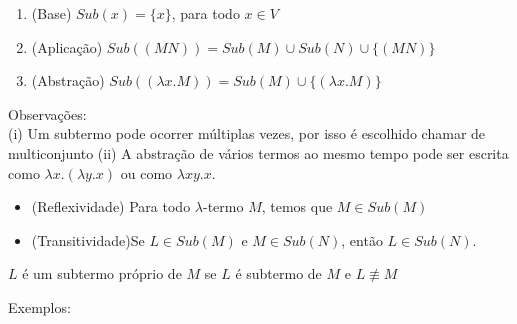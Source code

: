 \documentclass[../main.tex]{subfiles}
\begin{document}
\begin{definition}
    \hfill
    \begin{enumerate}
        \item (Base) $Sub(x) = \{x\}$, para todo $x \in V$
        \item (Aplicação) $Sub((M N)) = Sub(M) \cup Sub(N) \cup \{ (M N) \}$
        \item (Abstração) $Sub((\lambda x . M)) = Sub(M) \cup \{ (\lambda x . M) \}$
    \end{enumerate}

\end{definition}

Observações:\\
(i) Um subtermo pode ocorrer múltiplas vezes, por isso é escolhido chamar de multiconjunto
(ii) A abstração de vários termos ao mesmo tempo pode ser escrita como $\lambda x . (\lambda y . x)$ ou como $\lambda x y . x$.

\begin{lemma}
    \hfill
    \begin{itemize}
        \item (Reflexividade) Para todo $\lambda$-termo $M$, temos que $M \in Sub(M)$
        \item (Transitividade)Se $L \in Sub(M)$ e $M \in Sub(N)$, então $L \in Sub(N)$.
    \end{itemize}
\end{lemma}

\begin{definition}
    $L$ é um subtermo próprio de $M$ se $L$ é subtermo de $M$ e $L \not\equiv M$
\end{definition}

Exemplos: 
\end{document}
